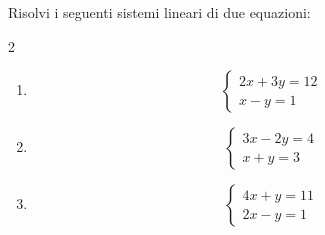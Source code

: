 \begin{question}[ID=1.2, subtitle={Sistemi lineari con coefficienti interi}, difficulty=facile, tags={sistemi, equazioni lineari}]
Risolvi i seguenti sistemi lineari di due equazioni:
\begin{multicols}{2}
\begin{enumerate}[leftmargin=3.2cm]
    \item
    \[
    \begin{cases}
    2x+3y=12\\
    x-y=1
    \end{cases}
    \]

    \item
    \[
    \begin{cases}
    3x-2y=4\\
    x+y=3
    \end{cases}
    \]

    \item
    \[
    \begin{cases}
    4x+y=11\\
    2x-y=1
    \end{cases}
    \]


\end{enumerate}
\end{multicols}
\end{question}
